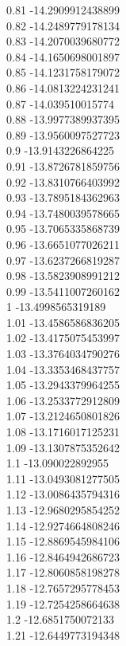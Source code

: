 {0.81	-14.2909912438899\\
0.82	-14.2489779178134\\
0.83	-14.2070039680772\\
0.84	-14.1650698001897\\
0.85	-14.1231758179072\\
0.86	-14.0813224231241\\
0.87	-14.039510015774\\
0.88	-13.9977389937395\\
0.89	-13.9560097527723\\
0.9	-13.9143226864225\\
0.91	-13.8726781859756\\
0.92	-13.8310766403992\\
0.93	-13.7895184362963\\
0.94	-13.7480039578665\\
0.95	-13.7065335868739\\
0.96	-13.6651077026211\\
0.97	-13.6237266819287\\
0.98	-13.5823908991212\\
0.99	-13.5411007260162\\
1	-13.4998565319189\\
1.01	-13.4586586836205\\
1.02	-13.4175075453997\\
1.03	-13.3764034790276\\
1.04	-13.3353468437757\\
1.05	-13.2943379964255\\
1.06	-13.2533772912809\\
1.07	-13.2124650801826\\
1.08	-13.1716017125231\\
1.09	-13.1307875352642\\
1.1	-13.090022892955\\
1.11	-13.0493081277505\\
1.12	-13.0086435794316\\
1.13	-12.9680295854252\\
1.14	-12.9274664808246\\
1.15	-12.8869545984106\\
1.16	-12.8464942686723\\
1.17	-12.8060858198278\\
1.18	-12.7657295778453\\
1.19	-12.7254258664638\\
1.2	-12.6851750072133\\
1.21	-12.6449773194348\\
}
